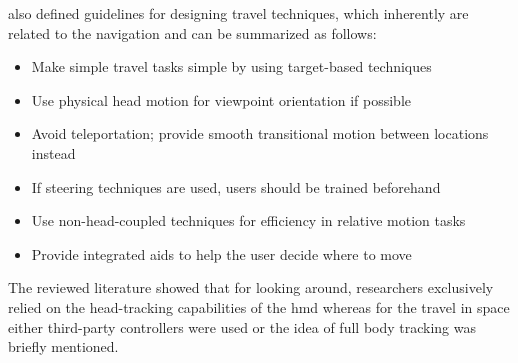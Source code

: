\cite{Bowman2002} also defined guidelines for designing travel techniques, which inherently are related to the navigation and can be summarized as follows:
\begin{itemize}[noitemsep,nolistsep]
	\item Make simple travel tasks simple by using target-based techniques
	\item Use physical head motion for viewpoint orientation if possible
	\item Avoid teleportation; provide smooth transitional motion between locations instead
	\item If steering techniques are used, users should be trained beforehand
	\item Use non-head-coupled techniques for efficiency in relative motion tasks
	\item Provide integrated aids to help the user decide where to move
\end{itemize}

The reviewed literature showed that for looking around, researchers exclusively relied on the head-tracking capabilities of the \gls{hmd} whereas for the travel in space either third-party controllers were used or the idea of full body tracking was briefly mentioned.

